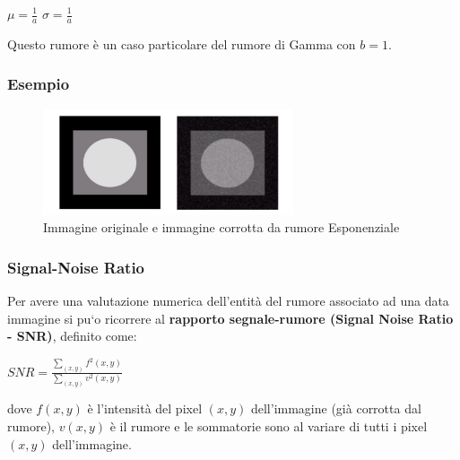 
\begin{center}
    $\mu = \frac{1}{a}$ $\sigma = \frac{1}{a}$
\end{center}

Questo rumore è un caso particolare del rumore di Gamma con $b = 1$.

\subsubsection{Esempio}

\begin{figure}[H]
    \centering
    \includegraphics[width=\linewidth, keepaspectratio]{capitoli/immagini/imgs/esempio-esponenziale.png}
    \caption*{Immagine originale e immagine corrotta da rumore Esponenziale}
\end{figure}

\subsubsection{Signal-Noise Ratio}
Per avere una valutazione numerica dell’entità del rumore associato ad una data immagine si pu`o ricorrere al \textbf{rapporto segnale-rumore
    (Signal Noise Ratio - SNR)}, definito come:

\begin{center}
    $
        SNR = \frac{\sum_{(x,y)}^{}f^2(x,y)}{\sum_{(x,y)}^{}v^2(x,y)}
    $
\end{center}

dove $f(x, y)$ è l’intensità del pixel $(x, y)$ dell’immagine (già corrotta dal rumore), $v(x, y)$ è il rumore e le sommatorie sono al
variare di tutti i pixel $(x, y)$ dell’immagine.
